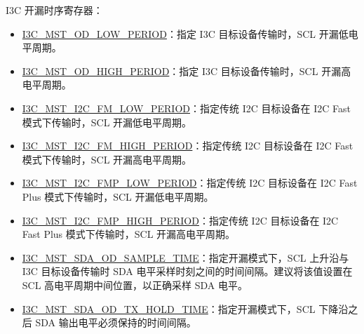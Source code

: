 \documentclass[main\_\_CN.tex]{subfiles}
\begin{document}
I3C 开漏时序寄存器：
\begin{itemize}
    \item \hyperref[fielddesc:I3CMSTREGI3CMSTODLOWPERIOD]{I3C\_MST\_OD\_LOW\_PERIOD}：指定 I3C 目标设备传输时，SCL 开漏低电平周期。
    \item \hyperref[fielddesc:I3CMSTREGI3CMSTODHIGHPERIOD]{I3C\_MST\_OD\_HIGH\_PERIOD}：指定 I3C 目标设备传输时，SCL 开漏高电平周期。
    \item \hyperref[fielddesc:I3CMSTREGI2CFMLOWPERIOD]{I3C\_MST\_I2C\_FM\_LOW\_PERIOD}：指定传统 I2C 目标设备在 I2C Fast 模式下传输时，SCL 开漏低电平周期。
    \item \hyperref[fielddesc:I3CMSTREGI2CFMHIGHPERIOD]{I3C\_MST\_I2C\_FM\_HIGH\_PERIOD}：指定传统 I2C 目标设备在 I2C Fast 模式下传输时，SCL 开漏高电平周期。
    \item \hyperref[fielddesc:I3CMSTREGI2CFMPLOWPERIOD]{I3C\_MST\_I2C\_FMP\_LOW\_PERIOD}：指定传统 I2C 目标设备在 I2C Fast Plus 模式下传输时，SCL 开漏低电平周期。
    \item \hyperref[fielddesc:I3CMSTREGI2CFMPHIGHPERIOD]{I3C\_MST\_I2C\_FMP\_HIGH\_PERIOD}：指定传统 I2C 目标设备在 I2C Fast Plus 模式下传输时，SCL 开漏高电平周期。
    \item \hyperref[fielddesc:I3CMSTREGSDAODSAMPLETIME]{I3C\_MST\_SDA\_OD\_SAMPLE\_TIME}：指定开漏模式下，SCL 上升沿与 I3C 目标设备传输时 SDA 电平采样时刻之间的时间间隔。建议将该值设置在 SCL 高电平周期中间位置，以正确采样 SDA 电平。
    \item \hyperref[fielddesc:I3CMSTREGSDAODTXHOLDTIME]{I3C\_MST\_SDA\_OD\_TX\_HOLD\_TIME}：指定开漏模式下，SCL 下降沿之后 SDA 输出电平必须保持的时间间隔。
\end{itemize}
\end{document}
